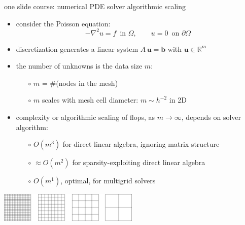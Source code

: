 \documentclass[svgnames,
               hyperref={colorlinks,citecolor=DeepPink4,linkcolor=FireBrick,urlcolor=Maroon},
               usepdftitle=false]  %
               {beamer}
\newcommand{\RR}{\mathbb{R}}
\newcommand{\grad}{\nabla}
\newcommand{\bb}{\mathbf{b}}
\newcommand{\bu}{\mathbf{u}}
\begin{document}
\begin{frame}{one slide course: numerical PDE solver algorithmic scaling}

\begin{itemize}
\item consider the Poisson equation:
    $$-\grad^2 u = f \,\text{ in $\Omega$}, \qquad u=0 \,\text{ on $\partial\Omega$}$$
\item discretization generates a linear system $A\,\bu = \bb$ with $\bu\in\RR^m$
\item the number of unknowns is the data size $m$:
    \begin{itemize}
    \item[$\circ$] $m$ = \#(nodes in the mesh)
    \item[$\circ$] $m$ scales with mesh cell diameter: \quad $m \sim h^{-2}$ \quad in 2D
    \end{itemize}
\item \alert{complexity} or \alert{algorithmic scaling} of flops, as $m\to\infty$, depends on solver algorithm:
    \begin{itemize}
    \item[$\circ$] $O(m^3)$ for direct linear algebra, ignoring matrix structure
    \item[$\circ$] $\approx O(m^2)$ for sparsity-exploiting direct linear algebra
    \item[$\circ$] $O(m^1)$, \alert{optimal}, for \alert{multigrid} solvers
    \end{itemize}
\end{itemize}

\medskip
\begin{center}
\includegraphics[width=0.5\textwidth]{../images/multigrid-grids.png}
\end{center}
\end{frame}
\end{document}
